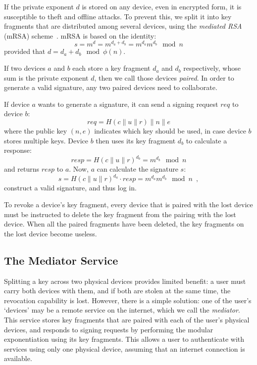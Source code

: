 \documentclass{llncs}
\newcommand*{\concat}{\mathbin{\|}}
\begin{document}
If the private exponent $d$ is stored on any device, even in encrypted form, it is susceptible to
theft and offline attacks. To prevent this, we split it into key fragments that are distributed
among several devices, using the \emph{mediated RSA} (mRSA) scheme~\cite{Boneh01,Kutyiowski12}.
mRSA is based on the identity:
\begin{equation}
s = m^d = m^{d_a + d_b} = m^{d_a} m^{d_b} \mod n
\end{equation}
provided that $d = d_a + d_b \mod \phi(n)$.

If two devices $a$ and $b$ each store a key fragment $d_a$ and $d_b$ respectively, whose sum is the
private exponent $d$, then we call those devices \emph{paired}. In order to generate a valid
signature, any two paired devices need to collaborate.

If device $a$ wants to generate a signature, it can send a signing request $\mathit{req}$ to device $b$:
\begin{equation}
\mathit{req} = H(c \concat u \concat r) \concat n \concat e
\end{equation}
where the public key $(n, e)$ indicates which key should be used, in case device $b$ stores multiple
keys. Device $b$ then uses its key fragment $d_b$ to calculate a response:
\begin{equation}
\mathit{resp} = H(c \concat u \concat r)^{d_b} = m^{d_b} \mod n
\end{equation}
and returns $\mathit{resp}$ to $a$. Now, $a$ can calculate the signature $s$:
\begin{equation}
s = H(c \concat u \concat r)^{d_a} \cdot \mathit{resp} = m^{d_a} m^{d_b} \mod n \enspace,
\end{equation}
construct a valid signature, and thus log in.

To revoke a device's key fragment, every device that is paired with the lost device must be
instructed to delete the key fragment from the pairing with the lost device. When all the paired
fragments have been deleted, the key fragments on the lost device become useless.

\subsection{The Mediator Service}\label{sec:mediator}

Splitting a key across two physical devices provides limited benefit: a user must carry both devices
with them, and if both are stolen at the same time, the revocation capability is lost. However,
there is a simple solution: one of the user's `devices' may be a remote service on the internet,
which we call the \emph{mediator}. This service stores key fragments that are paired with each of
the user's physical devices, and responds to signing requests by performing the modular
exponentiation using its key fragments. This allows a user to authenticate with services using only
one physical device, assuming that an internet connection is available.
\end{document}
